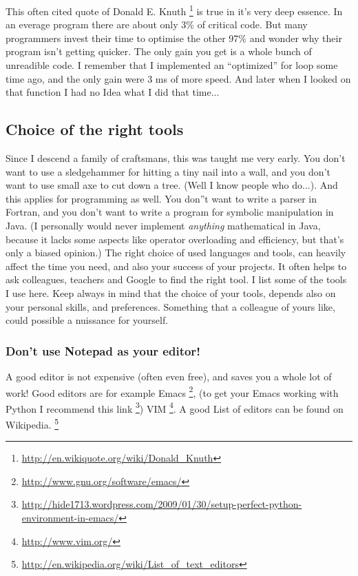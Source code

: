 \documentclass[letterpaper,10pt,english]{manual}
\begin{document}
This often cited quote of Donald E. Knuth \footnote{
\href{http://en.wikiquote.org/wiki/Donald\_Knuth}{http://en.wikiquote.org/wiki/Donald\_Knuth}
} is true in it's very deep essence. In an everage program
there are about only 3\% of critical code. But many programmers invest their time to optimise the
other 97\% and wonder why their program isn't getting quicker. The only gain you get is a whole bunch
of unreadible code. I remember that I implemented an ``optimized'' for loop some time ago, and the only gain were
3 ms of more speed. And later when I looked on that function I had no Idea what I did that time...


\subsection{Choice of the right tools}

Since I descend a family of craftsmans, this was taught me very early. You don't want to use
a sledgehammer for hitting a tiny nail into a wall, and you don't want to use small axe to cut down a tree.
(Well I know people who do...). And this applies for programming as well. You don''t want to write a parser in Fortran,
and you don't want to write a program for symbolic manipulation in Java. (I personally would never implement \emph{anything}
mathematical in Java, because it lacks some aspects like operator overloading and efficiency, but that's only a biased opinion.)
The right choice of used languages
and tools, can heavily affect the time you need, and also your success of your projects. It often helps to
ask colleagues, teachers and Google to find the right tool. I list
some of the tools I use here. Keep always in mind that the choice of
your tools, depends also on your personal skills, and
preferences. Something that a colleague of yours like, could possible
a nuissance for yourself.


\subsubsection{Don't use Notepad as your editor!}

A good editor is not expensive (often even free), and saves you a
whole lot of work! Good editors are for example Emacs \footnote{
\href{http://www.gnu.org/software/emacs/}{http://www.gnu.org/software/emacs/}
},
(to get your Emacs working with Python I recommend this link \footnote{
\href{http://hide1713.wordpress.com/2009/01/30/setup-perfect-python-environment-in-emacs/}{http://hide1713.wordpress.com/2009/01/30/setup-perfect-python-environment-in-emacs/}
})  VIM \footnote{
\href{http://www.vim.org/}{http://www.vim.org/}
}.
A good List of editors can be found on Wikipedia. \footnote{
\href{http://en.wikipedia.org/wiki/List\_of\_text\_editors}{http://en.wikipedia.org/wiki/List\_of\_text\_editors}
}
\end{document}
